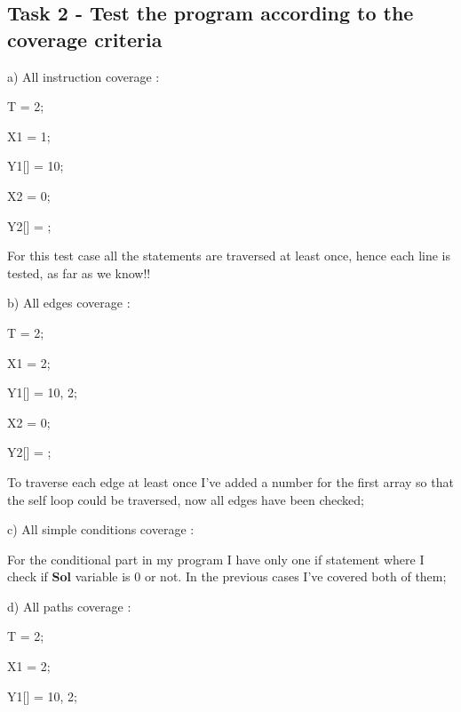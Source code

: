 \subsection{Task 2 - Test the program according to the coverage criteria}

a) All instruction coverage :

\vspace{0.5cm} 

T = 2; 

X1 = 1; 

Y1[] = {10}; 

X2 = 0; 

Y2[] = {};

\vspace{0.5cm} 

For this test case all the statements are traversed at least once, hence each line is tested, as far as we know!!
\vspace{1cm}


b) All edges coverage :

\vspace{0.5cm}

T = 2; 

X1 = 2; 

Y1[] = {10, 2}; 

X2 = 0; 

Y2[] = {};

\vspace{0.5cm}

To traverse each edge at least once I've added a number for the first array so that the self loop could be traversed, now all edges have been checked;

\vspace{1cm}


c) All simple conditions coverage :

\vspace{0.5cm}

For the conditional part in my program I have only one if statement where I check if \textbf{Sol} variable is 0 or not. In the previous cases I've covered both of them;

\vspace{1cm}


d) All paths coverage : 

\vspace{0.5cm}

T = 2; 

X1 = 2; 

Y1[] = {10, 2}; 

